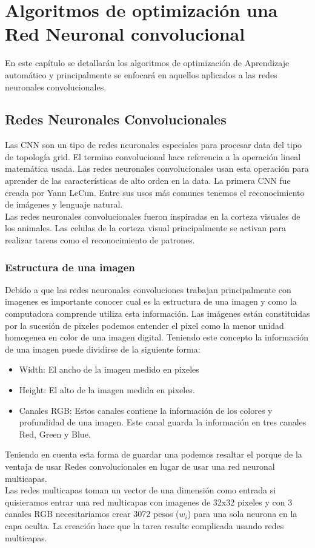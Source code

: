 \chapter{Algoritmos de optimización una Red Neuronal convolucional}
En este capítulo se detallarán los algoritmos de optimización de Aprendizaje automático y principalmente se enfocará en aquellos aplicados a las redes neuronales convolucionales.

\section{Redes Neuronales Convolucionales}
Las CNN son un tipo de redes neuronales especiales para procesar data del tipo de topología grid. El termino convolucional hace referencia a la operación lineal matemática usada. Las redes neuronales convolucionales usan esta operación para aprender de las características de alto orden en la data.
La primera CNN fue creada por Yann LeCun. Entre sus usos más comunes tenemos el reconocimiento de imágenes y lenguaje natural.\\
Las redes neuronales convolucionales fueron inspiradas en la corteza visuales de los animales. Las celulas de la corteza visual principalmente se activan para realizar tareas como el reconocimiento de patrones.

\subsection{Estructura de una imagen}
Debido a que las redes neuronales convoluciones trabajan principalmente con imagenes es importante conocer cual es la estructura de una imagen y como la computadora comprende utiliza esta información.
Las imágenes están constituidas por la sucesión de pixeles podemos entender el pixel como la menor unidad homogenea en color de una imagen digital. Teniendo este concepto la información de una imagen puede dividirse de la siguiente forma:
\begin{itemize}
	\item Width: El ancho de la imagen medido en pixeles
	\item Height: El alto de la imagen medida en pixeles.
	\item Canales RGB: Estos canales contiene la información de los colores y profundidad de una imagen. Este canal guarda la información en tres canales Red, Green y Blue.
\end{itemize}
Teniendo en cuenta esta forma de guardar una podemos resaltar el porque de la ventaja de usar Redes convolucionales en lugar de usar una red neuronal multicapas.\\ Las redes multicapas toman un vector de una dimensión como entrada si quisieramos entrar una red multicapas con imagenes de 32x32 pixeles y con 3 canales RGB necesitariamos crear 3072 pesos ($w_{i}$) para una sola neurona en la capa oculta. La creación hace que la tarea resulte complicada usando redes multicapas.
